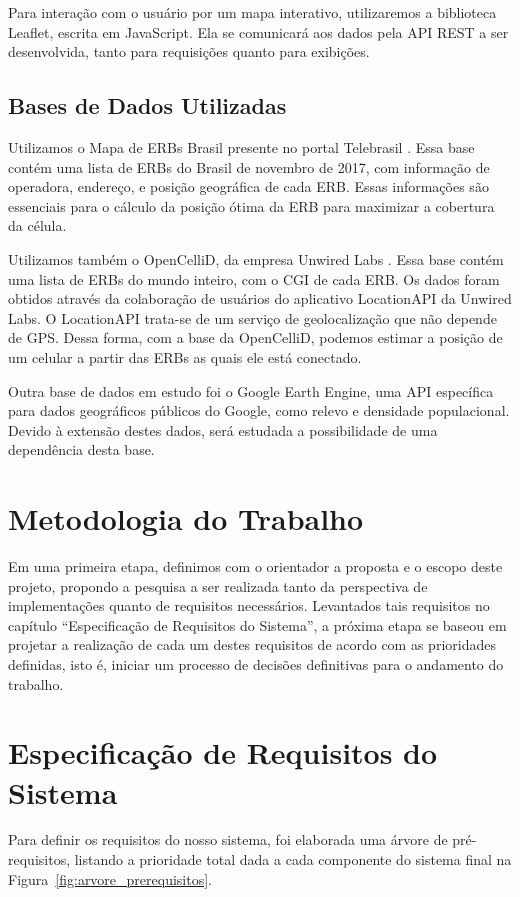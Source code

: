 \documentclass[]{politex}
\begin{document}
Para interação com o usuário por um mapa interativo, utilizaremos a biblioteca
Leaflet, escrita em JavaScript. Ela se comunicará aos dados pela API REST a ser
desenvolvida, tanto para requisições quanto para exibições.

\section{Bases de Dados Utilizadas}
Utilizamos o Mapa de ERBs Brasil presente no portal Telebrasil \cite{mapa-erb}.
Essa base contém uma lista de ERBs do Brasil de novembro de 2017, com
informação de operadora, endereço, e posição geográfica de cada ERB.
Essas informações são essenciais para o cálculo da posição ótima da ERB para
maximizar a cobertura da célula.

Utilizamos também o OpenCelliD, da empresa Unwired Labs \cite{opencellid}.
Essa base contém uma lista de ERBs do mundo inteiro, com o CGI de cada ERB.
Os dados foram obtidos através da colaboração de usuários do aplicativo
LocationAPI da Unwired Labs. O LocationAPI trata-se de um serviço de
geolocalização que não depende de GPS. Dessa forma, com a base da OpenCelliD,
podemos estimar a posição de um celular a partir das ERBs as quais ele está
conectado.

Outra base de dados em estudo foi o Google Earth Engine, uma API específica
para dados geográficos públicos do Google, como relevo e densidade populacional.
Devido à extensão destes dados, será estudada a possibilidade de uma dependência
desta base.

\chapter{Metodologia do Trabalho}
Em uma primeira etapa, definimos com o orientador a proposta e o escopo deste
projeto, propondo a pesquisa a ser realizada tanto da perspectiva de
implementações quanto de requisitos necessários. Levantados tais requisitos no
capítulo ``Especificação de Requisitos do Sistema'', a próxima etapa se baseou
em projetar a realização de cada um destes requisitos de acordo com as
prioridades definidas, isto é, iniciar um processo de decisões definitivas para
o andamento do trabalho.

\chapter{Especificação de Requisitos do Sistema}
Para definir os requisitos do nosso sistema, foi elaborada uma árvore de
pré-requisitos, listando a prioridade total dada a cada componente do sistema
final na Figura~\ref{fig:arvore_prerequisitos}.
\end{document}
